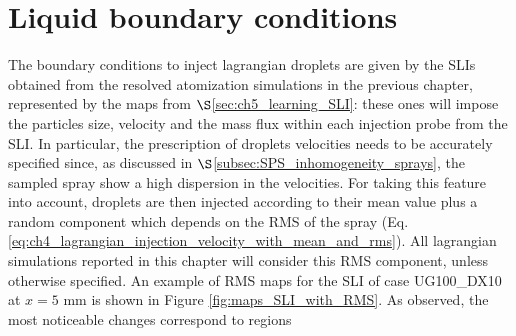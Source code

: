 \clearpage



\section{Liquid boundary conditions}
\label{sec:JICf_LGS_liquid_BCs}

The boundary conditions to inject lagrangian droplets are given by the SLIs obtained from the resolved atomization simulations in the previous chapter, represented by the maps from $\S$\ref{sec:ch5_learning_SLI}: these ones will impose the particles size, velocity and the mass flux within each injection probe from the SLI. In particular, the prescription of droplets velocities needs to be accurately specified since, as discussed in $\S$\ref{subsec:SPS_inhomogeneity_sprays}, the sampled spray show a high dispersion in the velocities. For taking this feature into account, droplets are then injected according to their mean value plus a random component which depends on the RMS of the spray (Eq. \ref{eq:ch4_lagrangian_injection_velocity_with_mean_and_rms}).  All lagrangian simulations reported in this chapter will consider this RMS component, unless otherwise specified. An example of RMS maps for the SLI of case UG100\_DX10 at $x = 5$ mm is shown in Figure \ref{fig:maps_SLI_with_RMS}. As observed, the most noticeable changes correspond to regions 

